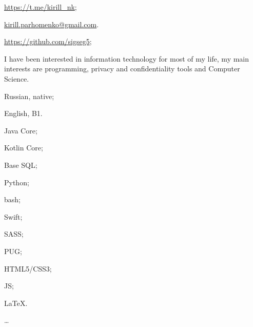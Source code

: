 \normalsize\normalfont
\SmallSep


\begin{multicols}{2}
	\begin{compactitem}[\color{Cyan}$\circ$]
		\item\small \url{https://t.me/kirill_nk};
		\item\small \href{mailto:kirill.parhomenko@gmail.com}{kirill.parhomenko@gmail.com}.
		\item\small \url{https://github.com/sigseg5};
	\end{compactitem}
\end{multicols}

\SmallSep



I have been interested in information technology for most of my life, my main interests are programming, privacy and confidentiality tools and Computer Science.

\Sep




\begin{multicols}{3}
\begin{compactitem}[\color{Cyan}$\circ$]
    \item Russian, native;
    \item English, B1.
\end{compactitem}
\end{multicols}

\SmallSep

\begin{multicols}{3}
\begin{compactitem}[\color{Cyan}$\circ$]
	\item Java Core;
	\item Kotlin Core;
	\item Base SQL;
    \item Python;
    \item bash;
    \item Swift;
    \item SASS;
    \item PUG;
    \item HTML5/CSS3;
    \item JS;
    \item \LaTeX.
    \item \ldots
\end{compactitem}
\end{multicols}

